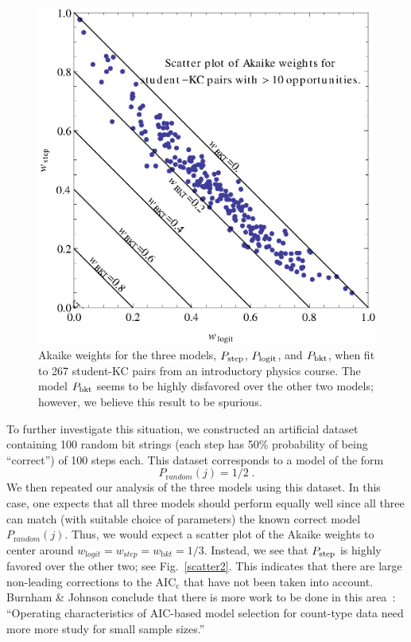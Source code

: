 \documentclass[11pt,letterpaper]{article}
\begin{document}
\begin{figure}
  \centering \includegraphics{scatter-weights.eps}
  \caption{Akaike weights for the three models, $P_{\rm step}$,
   $P_{\rm logit}$, and $P_{\rm bkt}$, when fit to 267
   student-KC pairs from an introductory physics course.
   The model $P_{\rm bkt}$ seems to be highly disfavored over
   the other two models; however, we believe this result
   to be spurious.} \label{scatter1}
\end{figure}

To further investigate this situation, we constructed an
artificial dataset containing 100 random bit strings (each
step has 50\% probability of being ``correct'') of 100 steps each.
This dataset corresponds to a model of the form
%
\begin{equation}
        P_{\mathrm random}(j)=1/2 \; .
\end{equation}
%
We then repeated our analysis of the three models using this
dataset.  In this
case, one expects that all three models should perform equally
well since all three can match (with suitable choice
of parameters) the known correct model $P_{\mathrm random}(j)$.
Thus, we would expect a scatter plot of the Akaike weights to 
center around 
$w_{\mathrm logit}=w_{\mathrm step}=w_{\mathrm bkt}=1/3$.
Instead, we see that $P_{\rm step}$ is highly favored over
the other two; see Fig.~\ref{scatter2}.  
This indicates that there are large non-leading
corrections to the AIC$_{\mathrm c}$ that have not been
taken into account.  Burnham \& Johnson conclude 
that there is more work to be done in this area~\cite[p.~380]{aicbook}: 
``Operating characteristics
of AIC-based model selection for count-type data need more 
more study for small sample sizes.''
\end{document}
